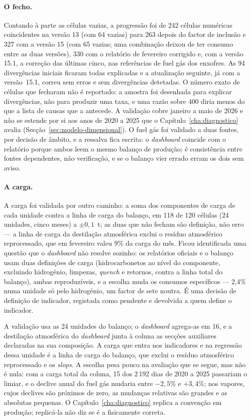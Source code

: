 \paragraph{O fecho.} Contando à parte as células vazias, a progressão foi
de 242 células numéricas coincidentes na versão 13 (com 64 vazias) para 263
depois do factor de inclusão e 327 com a versão 15 (com 65 vazias; uma
combinação deixou de ter consumo entre as duas versões), 330 com o
relatório de fevereiro corrigido e, com a versão 15.1, a correção das
últimas cinco, nas referências de fuel gás dos enxofres. As 94 divergências
iniciais ficaram todas explicadas e a atualização seguinte, já com a
versão~15.1, correu sem erros e sem divergências detetadas. O número exato
de células que fecharam não é reportado: a amostra foi desenhada para
explicar divergências, não para produzir uma taxa, e uma razão sobre 400
diria menos do que a lista de causas que a antecede. A
validação cobre janeiro a maio de 2026 e não se estende por si aos anos de
2020 a 2025 que o Capítulo~\ref{cha:diagnostico} avalia
(Secção~\ref{sec:modelo-dimensional}).
O fuel gás foi validado a duas fontes, por decisão de âmbito, e a
ressalva fica escrita: o \emph{dashboard} coincide com o relatório porque
ambos leem o mesmo balanço de produção; é consistência entre fontes
dependentes, não verificação, e se o balanço vier errado erram os dois
sem aviso.

\paragraph{A carga.} A carga foi validada por outro caminho: a soma dos
componentes de carga de cada unidade contra a linha de carga do balanço,
em 118 de 120 células (24 unidades, cinco meses) a $\pm0{,}1$~t; as duas
que não fecham são definição, não erro --- a linha de carga da destilação
atmosférica exclui o resíduo atmosférico reprocessado, que em fevereiro
valeu 9\% da carga do mês. Ficou identificada uma questão que o
\emph{dashboard} não resolve sozinho: os relatórios oficiais e o balanço
usam duas definições de carga (hidrocarbonetos ao nível do componente,
excluindo hidrogénio, limpezas, \emph{quench} e retornos, contra a linha
total do balanço), ambas reproduzíveis, e a escolha muda os consumos
específicos --- 2,4\% numa unidade só pelo hidrogénio, um factor de sete
noutra. É uma decisão de definição de indicador, registada como pendente
e devolvida a quem define o indicador.

A validação usa as 24 unidades do balanço; o \emph{dashboard} agrega-as em 16,
e a destilação atmosférica do \emph{dashboard} junta à coluna as secções
auxiliares declaradas na sua composição. A carga que entra nos indicadores
e na regressão dessa unidade é a linha de carga do balanço, que exclui o
resíduo atmosférico reprocessado e os \emph{slops}. A escolha pesa pouco na
avaliação que se segue, mas não é nula: com a carga total da coluna, 15 dos
2\,192 dias de 2020 a 2025 passariam o limiar, e o declive anual do fuel gás
mudaria entre $-2{,}5\%$ e $+3{,}4\%$; nos vapores, cujos declives são
próximos de zero, as mudanças relativas são grandes e as absolutas
pequenas. O Capítulo~\ref{cha:diagnostico} replica a convenção em produção;
replicá-la não diz se é a fisicamente correta.

